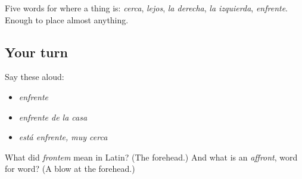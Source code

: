 \begin{grammarlens}[title={What you've built}]
Five words for where a thing is: \emph{cerca}, \emph{lejos}, \emph{la derecha}, \emph{la izquierda}, \emph{enfrente}. Enough to place almost anything.
\end{grammarlens}

\subsection*{Your turn}
Say these aloud:

\begin{itemize}
\raggedright
  \item \emph{enfrente}
  \item \emph{enfrente de la casa}
  \item \emph{está enfrente, muy cerca}
\end{itemize}

\begin{tcolorbox}[breakable,colback=teal!4,colframe=teal!35!black,title={Before you move on}]
What did \emph{frontem} mean in Latin? (The forehead.) And what is an \emph{affront}, word for word? (A blow at the forehead.)
\end{tcolorbox}
